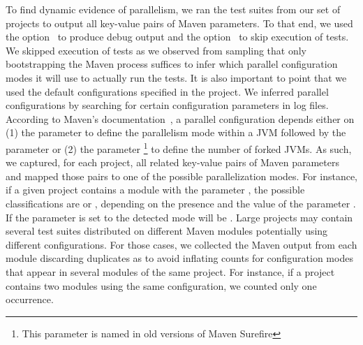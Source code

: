 To find dynamic evidence of parallelism, we ran the test suites from
our set of \numMedLong{} projects to output all key-value pairs of
Maven parameters.  To that end, we used the option~ to
produce debug output and the option~ to skip
execution of tests.  We skipped execution of tests as we observed from
sampling that only bootstrapping the Maven process suffices to infer
which parallel configuration modes it will use to actually run the
tests.  It is also important to point that we used the default
configurations specified in the project.  We inferred parallel
configurations by searching for certain configuration parameters in
log files. According to Maven's
documentation~\cite{maven-surefire-plugin}, a parallel configuration
depends either on (1) the parameter  to define the
parallelism mode within a JVM followed by the parameter
 or (2) the parameter
\footnote{This parameter is named 
  in old versions of Maven Surefire} to define the number of forked
JVMs.  As such, we captured, for each project, all related key-value
pairs of Maven parameters and mapped those pairs to one of the
possible parallelization modes.  For instance, if a given project
contains a module with the parameter
, the possible classifications are
\ForkSeq{} or \ForkParMeth{}, depending on the presence and the value
of the parameter .  If the parameter
 is set to  the detected mode will be
\ForkParMeth{}.  Large projects may contain several test suites
distributed on different Maven modules potentially using different
configurations.  For those cases, we collected the Maven output from
each module discarding duplicates as to avoid inflating counts for
configuration modes that appear in several modules of the same
project. For instance, if a project contains two modules using the
same configuration, we counted only one occurrence.


